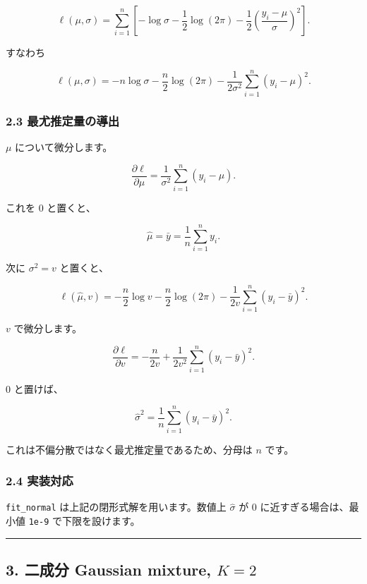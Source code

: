 \documentclass[
]{article}
\begin{document}
\[
\ell(\mu,\sigma)
=\sum_{i=1}^n\left[-\log\sigma-\frac{1}{2}\log(2\pi)-\frac{1}{2}\left(\frac{y_i-\mu}{\sigma}\right)^2\right].
\]

すなわち

\[
\ell(\mu,\sigma)
= -n\log\sigma-\frac{n}{2}\log(2\pi)
-\frac{1}{2\sigma^2}\sum_{i=1}^{n}(y_i-\mu)^2.
\]

\hypertarget{ux6700ux5c24ux63a8ux5b9aux91cfux306eux5c0eux51fa}{%
\subsubsection{2.3
最尤推定量の導出}\label{ux6700ux5c24ux63a8ux5b9aux91cfux306eux5c0eux51fa}}

\(\mu\) について微分します。

\[
\frac{\partial \ell}{\partial \mu}
=\frac{1}{\sigma^2}\sum_{i=1}^n(y_i-\mu).
\]

これを 0 と置くと、

\[
\hat\mu=\bar y=\frac{1}{n}\sum_{i=1}^{n}y_i.
\]

次に \(\sigma^2=v\) と置くと、

\[
\ell(\hat\mu,v)
=-\frac{n}{2}\log v-\frac{n}{2}\log(2\pi)
-\frac{1}{2v}\sum_{i=1}^{n}(y_i-\bar y)^2.
\]

\(v\) で微分します。

\[
\frac{\partial \ell}{\partial v}
=-\frac{n}{2v}+\frac{1}{2v^2}\sum_{i=1}^{n}(y_i-\bar y)^2.
\]

0 と置けば、

\[
\hat\sigma^2=\frac{1}{n}\sum_{i=1}^{n}(y_i-\bar y)^2.
\]

これは不偏分散ではなく最尤推定量であるため、分母は \(n\) です。

\hypertarget{ux5b9fux88c5ux5bfeux5fdc}{%
\subsubsection{2.4 実装対応}\label{ux5b9fux88c5ux5bfeux5fdc}}

\texttt{fit\_normal} は上記の閉形式解を用います。数値上 \(\hat\sigma\)
が 0 に近すぎる場合は、最小値 \texttt{1e-9} で下限を設けます。

\begin{center}\rule{0.5\linewidth}{0.5pt}\end{center}

\hypertarget{ux4e8cux6210ux5206-gaussian-mixture-k2}{%
\subsection{\texorpdfstring{3. 二成分 Gaussian mixture,
\(K=2\)}{3. 二成分 Gaussian mixture, K=2}}\label{ux4e8cux6210ux5206-gaussian-mixture-k2}}
\end{document}
